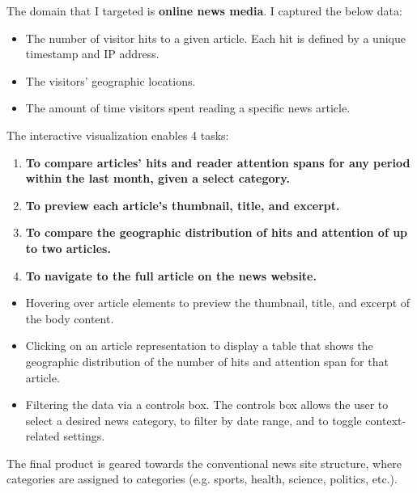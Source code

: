 \documentclass[12pt]{article}
\begin{document}
The domain that I targeted is \textbf{online news media}. I captured the below data:
\begin{itemize}
\item The number of visitor hits to a given article. Each hit is defined by a unique timestamp and IP address.
\item The visitors' geographic locations.
\item The amount of time visitors spent reading a specific news article.
\end{itemize}

\newpage

\noindent The interactive visualization enables 4 tasks:
\begin{enumerate}
\item \textbf{To compare articles' hits and reader attention spans for any period within the last month, given a select category.}
\item \textbf{To preview each article's thumbnail, title, and excerpt.}
\item \textbf{To compare the geographic distribution of hits and attention of up to two articles.}
\item \textbf{To navigate to the full article on the news website.}
\end{enumerate}

\begin{itemize}
\item Hovering over article elements to preview the thumbnail, title, and excerpt of the body content.
\item Clicking on an article representation to display a table that shows the geographic distribution of the number of hits and attention span for that article.
\item Filtering the data via a controls box. The controls box allows the user to select a desired news category, to filter by date range, and to toggle context-related settings. 
\end{itemize}

\noindent The final product is geared towards the conventional news site structure, where categories are assigned to categories (e.g. sports, health, science, politics, etc.). \\
\end{document}
